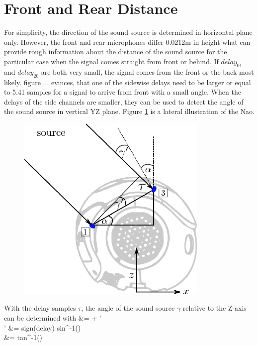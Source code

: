 \section{Front and Rear Distance}
\label{sec:02_distance}

For simplicity, the direction of the sound source is determined in
horizontal plane only.
However, the front and rear microphones differ 0.0212\si{m} in height
what can provide rough information about the distance of the sound source
for the particular case when the signal comes straight from front or behind.
If $delay_{01}$ and $delay_{20}$ are both very small, the signal comes from
the front or the back most likely.
figure ... evinces, that one of
the sidewise delays need to be larger or equal to 5.41 samples for a signal
to arrive from front with a small angle.
When the delays of the side channels are smaller, they can be used to
detect the angle of the sound source in vertical YZ plane.
Figure \ref{fig:02_headSideTdoa} is a lateral illustration of
the Nao.
\begin{figure}[ht]
	\centering
		\includegraphics[width=0.45\columnwidth]{figures/side_head_tdoa}
	\caption{}
    \label{fig:02_headSideTdoa}
\end{figure}
With the delay samples $\tau$, the angle of the sound source $\gamma$ relative
to the Z-axis can be determined with
\bsub \bal
\gamma &= \alpha + \gamma'\\
\gamma' &= sign(delay) \cdot sin^{-1}()\\
\alpha &= tan^{-1}()\\
